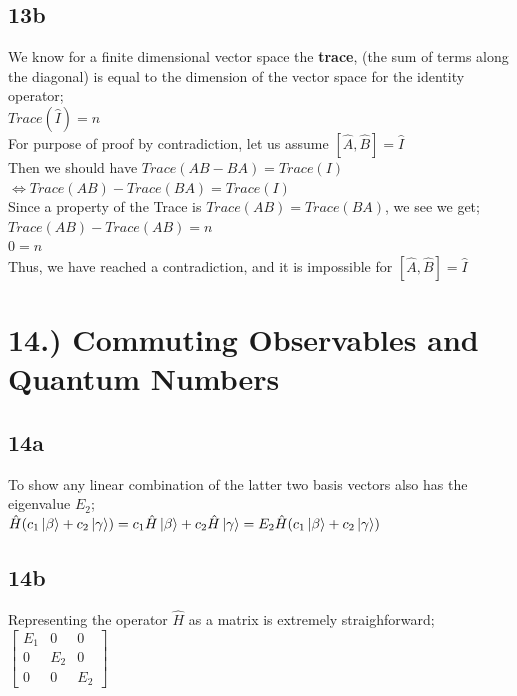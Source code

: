 \documentclass[10pt]{article}
\begin{document}
\subsection*{13b}

We know for a finite dimensional vector space the \textbf{trace}, (the sum of terms along the diagonal) is equal to the dimension of the vector space for the identity operator;\\

$Trace(\hat{I})=n$\\

For purpose of proof by contradiction, let us assume $[\hat{A},\hat{B}]=\hat{I}$\\
Then we should have $Trace(AB-BA)=Trace(I)$\\
$\Leftrightarrow Trace(AB)-Trace(BA)=Trace(I)$\\
Since a property of the Trace is $Trace(AB)=Trace(BA)$, we see we get; \\
$Trace(AB)-Trace(AB)=n$\\
$0=n$\\

Thus, we have reached a contradiction, and it is impossible for $[\hat{A},\hat{B}]=\hat{I}$\\
\pagebreak
\section*{14.) Commuting Observables and Quantum Numbers}
\subsection*{14a}
To show any linear combination of the latter two basis vectors also has the eigenvalue $E_2$;\\

$\hat{H}(c_1\ket{\beta}+c_2\ket{\gamma})=c_1\hat{H}\ket{\beta}+c_2\hat{H}\ket{\gamma}=E_2\hat{H}(c_1\ket{\beta}+c_2\ket{\gamma})$\\
\subsection*{14b}
Representing the operator $\hat{H}$ as a matrix is extremely straighforward;\\

$\begin{bmatrix}
E_1 & 0 & 0 \\
 0 & E_2 & 0 \\
 0 & 0 & E_2
\end{bmatrix}$
\end{document}
